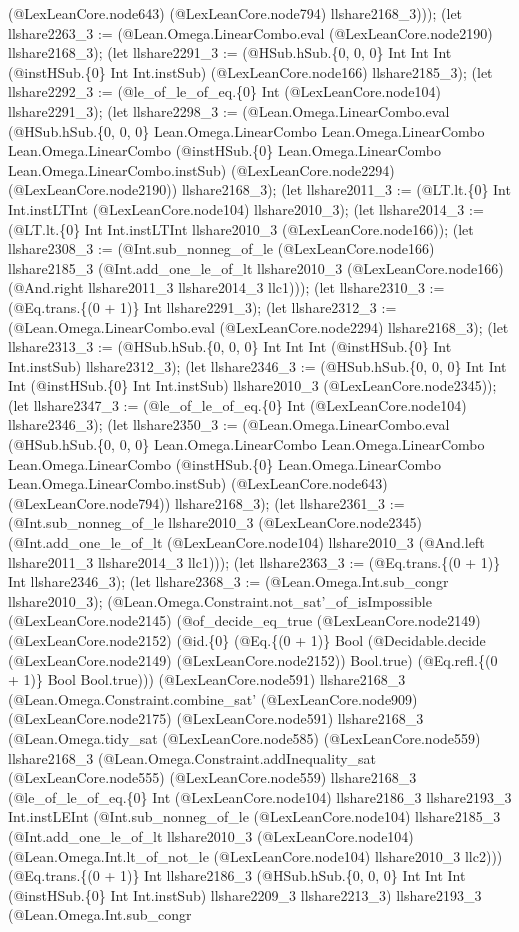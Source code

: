 \documentclass[11pt]{article}
\begin{document}
(@LexLeanCore.node643) (@LexLeanCore.node794) llshare2168\_3))); (let llshare2263\_3 := (@Lean.Omega.LinearCombo.eval (@LexLeanCore.node2190) llshare2168\_3); (let llshare2291\_3 := (@HSub.hSub.\{0, 0, 0\} Int Int Int (@instHSub.\{0\} Int Int.instSub) (@LexLeanCore.node166) llshare2185\_3); (let llshare2292\_3 := (@le\_of\_le\_of\_eq.\{0\} Int (@LexLeanCore.node104) llshare2291\_3); (let llshare2298\_3 := (@Lean.Omega.LinearCombo.eval (@HSub.hSub.\{0, 0, 0\} Lean.Omega.LinearCombo Lean.Omega.LinearCombo Lean.Omega.LinearCombo (@instHSub.\{0\} Lean.Omega.LinearCombo Lean.Omega.LinearCombo.instSub) (@LexLeanCore.node2294) (@LexLeanCore.node2190)) llshare2168\_3); (let llshare2011\_3 := (@LT.lt.\{0\} Int Int.instLTInt (@LexLeanCore.node104) llshare2010\_3); (let llshare2014\_3 := (@LT.lt.\{0\} Int Int.instLTInt llshare2010\_3 (@LexLeanCore.node166)); (let llshare2308\_3 := (@Int.sub\_nonneg\_of\_le (@LexLeanCore.node166) llshare2185\_3 (@Int.add\_one\_le\_of\_lt llshare2010\_3 (@LexLeanCore.node166) (@And.right llshare2011\_3 llshare2014\_3 llc1))); (let llshare2310\_3 := (@Eq.trans.\{(0 + 1)\} Int llshare2291\_3); (let llshare2312\_3 := (@Lean.Omega.LinearCombo.eval (@LexLeanCore.node2294) llshare2168\_3); (let llshare2313\_3 := (@HSub.hSub.\{0, 0, 0\} Int Int Int (@instHSub.\{0\} Int Int.instSub) llshare2312\_3); (let llshare2346\_3 := (@HSub.hSub.\{0, 0, 0\} Int Int Int (@instHSub.\{0\} Int Int.instSub) llshare2010\_3 (@LexLeanCore.node2345)); (let llshare2347\_3 := (@le\_of\_le\_of\_eq.\{0\} Int (@LexLeanCore.node104) llshare2346\_3); (let llshare2350\_3 := (@Lean.Omega.LinearCombo.eval (@HSub.hSub.\{0, 0, 0\} Lean.Omega.LinearCombo Lean.Omega.LinearCombo Lean.Omega.LinearCombo (@instHSub.\{0\} Lean.Omega.LinearCombo Lean.Omega.LinearCombo.instSub) (@LexLeanCore.node643) (@LexLeanCore.node794)) llshare2168\_3); (let llshare2361\_3 := (@Int.sub\_nonneg\_of\_le llshare2010\_3 (@LexLeanCore.node2345) (@Int.add\_one\_le\_of\_lt (@LexLeanCore.node104) llshare2010\_3 (@And.left llshare2011\_3 llshare2014\_3 llc1))); (let llshare2363\_3 := (@Eq.trans.\{(0 + 1)\} Int llshare2346\_3); (let llshare2368\_3 := (@Lean.Omega.Int.sub\_congr llshare2010\_3); (@Lean.Omega.Constraint.not\_sat'\_of\_isImpossible (@LexLeanCore.node2145) (@of\_decide\_eq\_true (@LexLeanCore.node2149) (@LexLeanCore.node2152) (@id.\{0\} (@Eq.\{(0 + 1)\} Bool (@Decidable.decide (@LexLeanCore.node2149) (@LexLeanCore.node2152)) Bool.true) (@Eq.refl.\{(0 + 1)\} Bool Bool.true))) (@LexLeanCore.node591) llshare2168\_3 (@Lean.Omega.Constraint.combine\_sat' (@LexLeanCore.node909) (@LexLeanCore.node2175) (@LexLeanCore.node591) llshare2168\_3 (@Lean.Omega.tidy\_sat (@LexLeanCore.node585) (@LexLeanCore.node559) llshare2168\_3 (@Lean.Omega.Constraint.addInequality\_sat (@LexLeanCore.node555) (@LexLeanCore.node559) llshare2168\_3 (@le\_of\_le\_of\_eq.\{0\} Int (@LexLeanCore.node104) llshare2186\_3 llshare2193\_3 Int.instLEInt (@Int.sub\_nonneg\_of\_le (@LexLeanCore.node104) llshare2185\_3 (@Int.add\_one\_le\_of\_lt llshare2010\_3 (@LexLeanCore.node104) (@Lean.Omega.Int.lt\_of\_not\_le (@LexLeanCore.node104) llshare2010\_3 llc2))) (@Eq.trans.\{(0 + 1)\} Int llshare2186\_3 (@HSub.hSub.\{0, 0, 0\} Int Int Int (@instHSub.\{0\} Int Int.instSub) llshare2209\_3 llshare2213\_3) llshare2193\_3 (@Lean.Omega.Int.sub\_congr 
\end{document}
